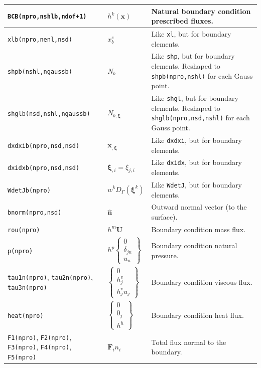 \documentclass{ucb}
\begin{document}
\begin{longtable}[c]{m{} m{} m{}}
    \midrule
    \texttt{BCB(npro,nshlb,ndof+1)} & $h^k(\bm{x})$ & Natural boundary condition prescribed fluxes. \\
    \midrule
    \texttt{xlb(npro,nenl,nsd)} & $x_b^e$ & Like \texttt{xl}, but for boundary elements. \\
    \midrule
    \texttt{shpb(nshl,ngaussb)} & $N_b$ & Like \texttt{shp}, but for boundary elements. Reshaped to \texttt{shpb(npro,nshl)} for each Gauss point. \\
    \midrule
    \texttt{shglb(nsd,nshl,ngaussb)} & $N_{b,\bm{\xi}}$ & Like \texttt{shgl}, but for boundary elements. Reshaped to \texttt{shglb(npro,nsd,nshl)} for each Gauss point. \\
    \midrule
    \texttt{dxdxib(npro,nsd,nsd)} &  $\bm{x}_{,\bm{\xi}}$ & Like \texttt{dxdxi}, but for boundary elements. \\
    \midrule
    \texttt{dxidxb(npro,nsd,nsd)} & $\bm{\xi}_{,i} = \xi_{j,i}$ & Like \texttt{dxidx}, but for boundary elements. \\
    \midrule
    \texttt{WdetJb(npro)} & $w^k D_\Gamma(\bm{\xi}^k)$ & Like \texttt{WdetJ}, but for boundary elements. \\
    \midrule
    \texttt{bnorm(npro,nsd)} & $\bm{\hat{n}}$ & Outward normal vector (to the surface). \\
    \midrule
    \texttt{rou(npro)} & $h^m\bm{U}$ & Boundary condition mass flux. \\
    \midrule
    \texttt{p(npro)} & $h^p\begin{Bmatrix}0 \\ \delta_{jn} \\ u_n\end{Bmatrix}$ & Boundary condition natural pressure. \\
    \midrule
    \texttt{tau1n(npro)}, \texttt{tau2n(npro)}, \texttt{tau3n(npro)} & $\begin{Bmatrix}0 \\ h_j^v \\ h_j^v u_j\end{Bmatrix}$ & Boundary condition viscous flux. \\
    \midrule
    \texttt{heat(npro)} & $\begin{Bmatrix}0 \\ 0_j \\ h^h\end{Bmatrix}$ & Boundary condition heat flux. \\
    \midrule
    \texttt{F1(npro)}, \texttt{F2(npro)}, \texttt{F3(npro)}, \texttt{F4(npro)}, \texttt{F5(npro)} & $\bm{F}_i n_i$ & Total flux normal to the boundary. \\

\end{longtable}
\end{document}
